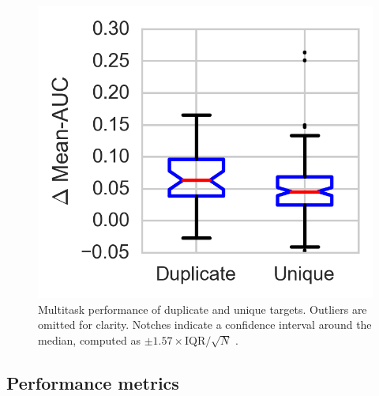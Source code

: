 \begin{figure}[ht]
\centering
\includegraphics[width=0.5\linewidth]{Images/duplicate.png}
\caption{Multitask performance of duplicate and unique targets. Outliers
  are omitted for clarity. Notches indicate a confidence interval around the
  median, computed as $\pm 1.57 \times \text{IQR}/ \sqrt{N}$
  \citep{mcgill1978variations}.}
\label{fig:duplicates}
\end{figure}

\clearpage

\subsection{Performance metrics}

